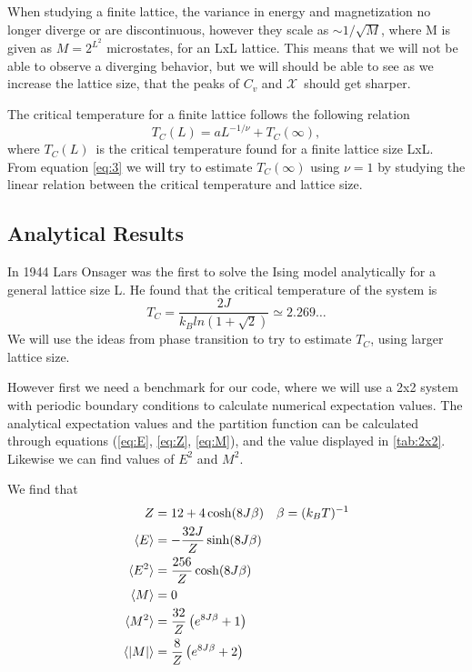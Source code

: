 \documentclass[%
reprint,
nofootinbib,
amsmath,amssymb,
aps,
]{revtex4-1}
\begin{document}
When studying a finite lattice, the variance in energy and magnetization no longer diverge or are discontinuous, however they scale as $\sim 1/\sqrt{M}$, where M is given as $M = 2^{L^2}$ microstates, for an LxL lattice. This means that we will not be able to observe a diverging behavior, but we will should be able to see as we increase the lattice size, that the peaks of $C_v$ and $\mathcal{X}$ should get sharper. 

The critical temperature for a finite lattice follows the following relation 
\begin{equation}\label{eq:3}
	T_C(L) = aL^{-1/\nu} + T_C(\infty),
\end{equation}
where $T_C(L)$ is the critical temperature found for a finite lattice size LxL. From equation \eqref{eq:3} we will try to estimate $T_C(\infty)$ using $\nu = 1$ by studying the linear relation between the critical temperature and lattice size. 
\subsection{Analytical Results} %
In 1944 Lars Onsager was the first to solve the Ising model analytically for a general lattice size L\cite{LarsOnsager}. He found that the critical temperature of the system is 
\begin{equation}
	T_C = \frac{2J}{k_Bln(1+\sqrt{2})}\simeq 2.269\dots
\end{equation} 
We will use the ideas from phase transition to try to estimate $T_C$, using larger lattice size. 

However first we need a benchmark for our code, where we will use a 2x2 system with periodic boundary conditions to calculate numerical expectation values. The analytical expectation values and the partition function can be calculated through equations (\ref{eq:E}, \ref{eq:Z}, \ref{eq:M}), and the value displayed in \autoref{tab:2x2}. Likewise we can find values of $E^2$ and $M^2$. 

We find that 
\begin{align}
	Z &= 12 + 4\cosh(8J\beta) && \beta = (k_BT)^{-1}\\
	\langle E\rangle &= -\frac{32J}{Z}\sinh(8J\beta)\\
	\langle E^2\rangle &= \frac{256}{Z}\cosh(8J\beta)\\
	\langle M\rangle &= 0\\
	\langle M^2\rangle &=\frac{32}{Z}\left(e^{8J\beta} + 1\right)\\
	\langle \abs{M}\rangle &= \frac{8}{Z}\left(e^{8J\beta} + 2\right)
\end{align}
\end{document}

